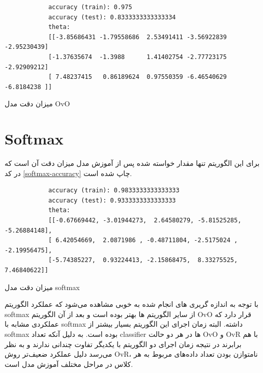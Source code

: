\documentclass[]{article}
\begin{document}
\begin{code}[h]
	\begin{latin}
		\begin{verbatim}
			accuracy (train): 0.975
			accuracy (test): 0.8333333333333334
			theta:
			[[-3.85686431 -1.79558686  2.53491411 -3.56922839 -2.95230439]
			[-1.37635674  -1.3988      1.41402754 -2.77723175 -2.92909212]
			[ 7.48237415   0.86189624  0.97550359 -6.46540629 -6.8184238 ]]
		\end{verbatim}
	\end{latin}
	\caption{میزان دقت مدل OvO}
	\label{ovo-accuracy}
\end{code}

\newpage

\section{Softmax}
برای این الگوریتم تنها مقدار خواسته شده پس از آموزش مدل میزان دقت آن است که در کد \ref{softmax-accuracy} چاپ شده است.
\begin{code}[h]
	\begin{latin}
		\begin{verbatim}
			accuracy (train): 0.9833333333333333
			accuracy (test): 0.9333333333333333
			theta:
			[[-0.67669442, -3.01944273,  2.64580279, -5.81525285, -5.26884148],
			[ 6.42054669,  2.0871986 , -0.48711804, -2.5175024 , -2.19956475],
			[-5.74385227,  0.93224413, -2.15868475,  8.33275525,  7.46840622]]
		\end{verbatim}
	\end{latin}
	\caption{میزان دقت مدل softmax}
	\label{softmax-accuracy}
\end{code}

با توجه به اندازه گریری های انجام شده به خوبی مشاهده می‌شود که عملکرد الگوریتم softmax از سایر الگوریتم ها بهتر بوده است و بعد از آن الگوریتم OvO قرار دارد که عملکردی مشابه با softmax داشته. البته زمان اجرای این الگوریتم بسیار بیشتر از softmax بوده است. به دلیل آنکه تعداد classifier ها در هر دو حالت OvO و OvR با هم برابرند در نتیجه زمان اجرای دو الگوریتم با یکدیگر تفاوت چندانی ندارند و به نظر می‌رسد دلیل عملکرد ضعیف‌تر روش OvR، نامتوازن بودن تعداد داده‌های مربوط به هر کلاس در مراحل مختلف آموزش مدل است.
\end{document}
